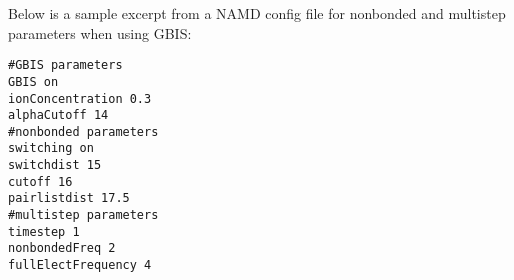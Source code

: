 Below is a sample excerpt from a NAMD config file for nonbonded and multistep parameters when using GBIS:
\begin{verbatim}
#GBIS parameters
GBIS on
ionConcentration 0.3
alphaCutoff 14
#nonbonded parameters
switching on
switchdist 15
cutoff 16
pairlistdist 17.5
#multistep parameters
timestep 1
nonbondedFreq 2
fullElectFrequency 4
\end{verbatim}
%
%
%

\begin{comment}

\end{comment}

